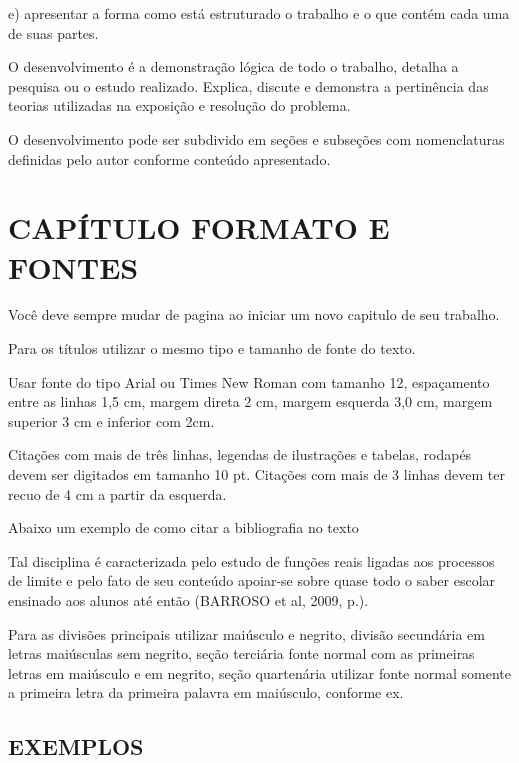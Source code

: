 \documentclass[
	12pt,				%
	oneside,			%
	a4paper,			%
	english,			%
	french,				%
	spanish,			%
	brazil,				%
	]{abntex2}
\theoremstyle{plain}
\theoremstyle{definition}
\begin{document}
    e) apresentar a forma como está estruturado o trabalho e o que contém cada uma de suas partes.
    
O desenvolvimento é a demonstração lógica de todo o trabalho, detalha a pesquisa ou o estudo realizado. Explica, discute e demonstra a pertinência das teorias utilizadas na exposição e resolução do problema. 

O desenvolvimento pode ser subdivido em seções e subseções com nomenclaturas definidas pelo autor conforme conteúdo apresentado. 



\chapter{CAPÍTULO FORMATO E FONTES} %

Você deve sempre mudar de pagina ao iniciar um novo capitulo de seu trabalho.

Para os títulos utilizar o mesmo tipo e tamanho de fonte do texto. 

Usar fonte do tipo Arial ou Times New Roman com tamanho 12, espaçamento entre as linhas 1,5 cm, margem direta 2 cm, margem esquerda 3,0 cm, margem superior 3 cm e inferior com 2cm.

Citações com mais de três linhas, legendas de ilustrações e tabelas, rodapés devem ser digitados em tamanho 10 pt. Citações com mais de 3 linhas devem ter recuo de 4 cm a partir da esquerda.

Abaixo um exemplo de como citar a bibliografia no texto

\begin{citacao}
 Tal disciplina é caracterizada pelo estudo de funções reais ligadas aos processos de limite e pelo fato de seu conteúdo apoiar-se sobre quase todo o saber escolar ensinado aos alunos até então (BARROSO et al, 2009, p.).
\end{citacao}

Para as divisões principais utilizar maiúsculo e negrito, divisão secundária em letras maiúsculas sem negrito, seção terciária fonte normal com as primeiras letras em maiúsculo e em negrito, seção quartenária utilizar fonte normal somente a primeira letra da primeira palavra em maiúsculo, conforme ex.


\section{EXEMPLOS} %
\end{document}
